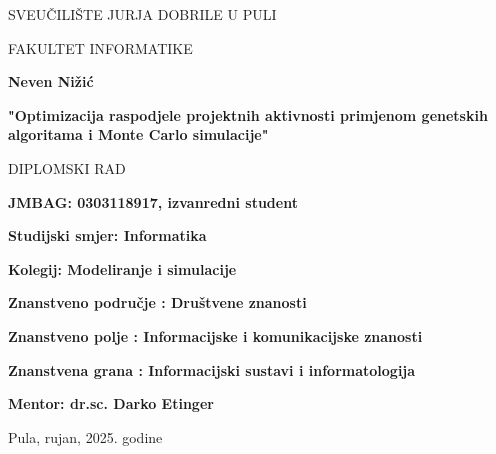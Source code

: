 \begin{center}
SVEUČILIŠTE JURJA DOBRILE U PULI 

FAKULTET INFORMATIKE

\vspace{45mm} 

\textbf{Neven Nižić}

\vspace{20mm} 

\textbf{"Optimizacija raspodjele projektnih aktivnosti primjenom genetskih algoritama i Monte Carlo simulacije"}

\vspace{5mm}
DIPLOMSKI RAD

\end{center}

\vspace{45mm}

\textbf{JMBAG: 0303118917, izvanredni student}

\textbf{Studijski smjer: Informatika}
\bigskip

\textbf{Kolegij: Modeliranje i simulacije}

\textbf{Znanstveno područje : Društvene znanosti}

\textbf{Znanstveno polje : Informacijske i komunikacijske znanosti}

\textbf{Znanstvena grana : Informacijski sustavi i informatologija}
\bigskip

\textbf{Mentor: dr.sc. Darko Etinger}

\vfill

\begin{center}

Pula, rujan, 2025. godine

\end{center}
